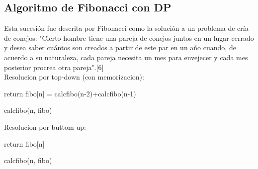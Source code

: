 \documentclass[spanish]{article}
\begin{document}
	\subsection{Algoritmo de Fibonacci con DP}
		Esta sucesión fue descrita por Fibonacci como la solución a un problema de cría de conejos: "Cierto hombre tiene una pareja de conejos juntos en un lugar cerrado y desea saber cuántos son creados a partir de este par en un año cuando, de acuerdo a su naturaleza, cada pareja necesita un mes para envejecer y cada mes posterior procrea otra pareja".[6]\\
		Resolucion por top-down (con memorizacion):\\	
		\begin{algorithm}[H]
			return fibo[n] = calcfibo(n-2)+calcfibo(n-1)\;
			\caption{calcfibo(n, fibo)}
		\end{algorithm}
		Resolucion por buttom-up:\\	
		\begin{algorithm}[H]
			return fibo[n]\;
			\caption{calcfibo(n, fibo)}
		\end{algorithm}			
\end{document}
